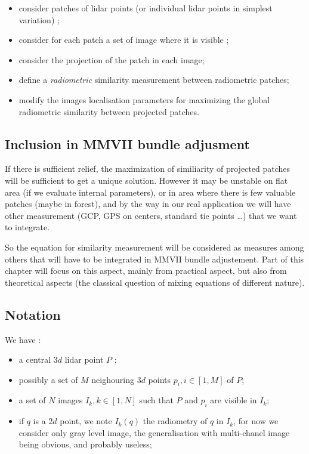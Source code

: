 \begin{itemize}
   \item  consider patches of lidar points (or individual lidar points in simplest variation) ;
   \item  consider for each patch a set of image where it is visible ;
   \item  consider the projection of the patch in each image;
   \item  define a \emph{radiometric} similarity  measurement between radiometric
          patches;
   \item  modify the images localisation parameters  for maximizing the global radiometric similarity between 
          projected patches.
\end{itemize}


\subsection{Inclusion in MMVII bundle adjusment}

If there is sufficient relief, the maximization of similiarity of projected patches 
will be sufficient to get a unique solution. However it may be unstable on flat area (if we evaluate internal parameters),
or in area where there is few valuable patches (maybe in forest), and  by the way in our real
application we will have other measurement (GCP, GPS on centers, standard tie points \dots ) that we want to
integrate.

So the equation for similarity measurement will be considered as measures among others that will have
to be integrated in MMVII bundle adjustement. Part of this chapter will focus on this aspect,
mainly from practical aspect, but also from theoretical aspects (the classical question
of mixing equations of different nature).


\subsection{Notation}
\label{LidImReg:Notation}

We have :

\begin{itemize}
    \item a central $3d$ lidar point $P$ ;
    \item possibly a set of $M$ neighouring $3d$ points  $p_i, i \in [1,M] $ of $P$;
    \item a set of $N$ images $I_k, k \in [1,N] $ such that $P$ and $p_i$ are visible in $I_k$;
    \item if $q$ is a $2d$ point, we note $I_k(q)$ the radiometry of $q$ in $I_k$,
          for now we consider only gray level image, the generalisation with multi-chanel
          image being obvious, and probably useless;
\end{itemize}

